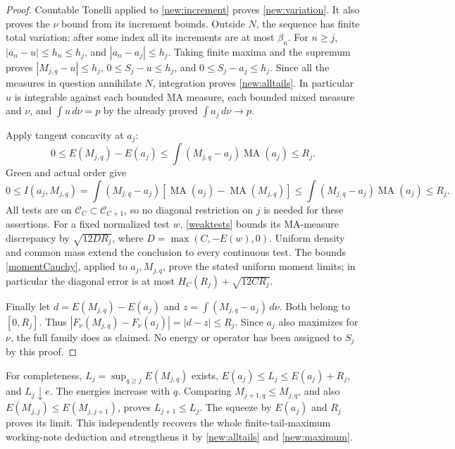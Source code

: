 \documentclass[11pt]{article}
\newcommand{\MA}{\operatorname{MA}}
\newcommand{\C}{\mathcal C}
\begin{document}
\begin{proof}
Countable Tonelli applied to \eqref{new:increment} proves
\eqref{new:variation}. It also proves the $\nu$ bound from its
increment bounds. Outside $N$, the sequence has finite total variation:
after some index all its increments are at most $\beta_n$. For
$n\ge j$, $|a_n-u|\le h_n\le h_j$, and
$|a_n-a_j|\le h_j$. Taking finite maxima and the supremum proves
$|M_{j,q}-u|\le h_j$, $0\le S_j-u\le h_j$, and
$0\le S_j-a_j\le h_j$. Since all the measures in question annihilate
$N$, integration proves \eqref{new:alltails}. In particular $u$ is
integrable against each bounded MA measure, each bounded mixed measure
and $\nu$, and $\int u\,d\nu=p$ by the already proved
$\int a_j\,d\nu\to p$.

Apply tangent concavity at $a_j$:
\[
 0\le E(M_{j,q})-E(a_j)
 \le\int(M_{j,q}-a_j)\MA(a_j)\le R_j.
\]
Green and actual order give
\[
 0\le I(a_j,M_{j,q})
 =\int(M_{j,q}-a_j)[\MA(a_j)-\MA(M_{j,q})]
 \le\int(M_{j,q}-a_j)\MA(a_j)\le R_j.
\]
All tests are on $\C_C\subset\C_{C+1}$, so no diagonal restriction
on $j$ is needed for these assertions. For a fixed normalized test $w$,
\eqref{weaktests} bounds its MA-measure discrepancy by
$\sqrt{12D R_j}$, where $D=\max(C,-E(w),0)$.
Uniform density and common mass extend the conclusion to every
continuous test. The bounds \eqref{momentCauchy}, applied to
$a_j,M_{j,q}$, prove the stated uniform moment limits; in particular
the diagonal error is at most $H_C(R_j)+\sqrt{12CR_j}$.

Finally let $d=E(M_{j,q})-E(a_j)$ and
$z=\int(M_{j,q}-a_j)\,d\nu$. Both belong to $[0,R_j]$.
Thus $|F_\nu(M_{j,q})-F_\nu(a_j)|=|d-z|\le R_j$.
Since $a_j$ also maximizes for $\nu$, the full family does as claimed.
No energy or operator has been assigned to $S_j$ by this proof.
\end{proof}

For completeness, $L_j=\sup_{q\ge j}E(M_{j,q})$ exists,
$E(a_j)\le L_j\le E(a_j)+R_j$, and $L_j\downarrow e$.
The energies increase with $q$. Comparing
$M_{j+1,q}\le M_{j,q}$, and also
$E(M_{j,j})\le E(M_{j,j+1})$, proves $L_{j+1}\le L_j$.
The squeeze by $E(a_j)$ and $R_j$ proves its limit. This independently
recovers the whole finite-tail-maximum working-note deduction and
strengthens it by \eqref{new:alltails} and \eqref{new:maximum}.
\end{document}
